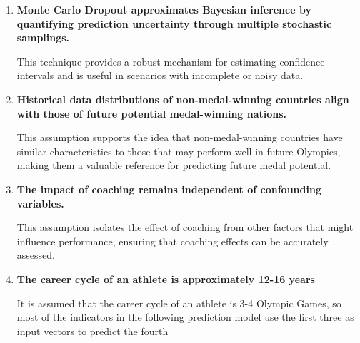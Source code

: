 \documentclass{mcmthesis}
\begin{document}
\begin{enumerate}[leftmargin=0.15in, labelsep=0.1in, itemsep=10pt, parsep=5pt]
	
	\item \textbf{Monte Carlo Dropout approximates Bayesian inference by quantifying prediction uncertainty through multiple stochastic samplings.}
	
	This technique provides a robust mechanism for estimating confidence intervals and is useful in scenarios with incomplete or noisy data.
	
	\item \textbf{Historical data distributions of non-medal-winning countries align with those of future potential medal-winning nations.} 
	
	This assumption supports the idea that non-medal-winning countries have similar characteristics to those that may perform well in future Olympics, making them a valuable reference for predicting future medal potential.
	
	\item \textbf{The impact of coaching remains independent of confounding variables.}
			
	This assumption isolates the effect of coaching from other factors that might influence performance, ensuring that coaching effects can be accurately assessed.
	\item \textbf{The career cycle of an athlete is approximately 12-16 years}
	
	It is assumed that the career cycle of an athlete is 3-4 Olympic Games, so most of the indicators in the following prediction model use the first three as input vectors to predict the fourth
\end{enumerate}

\end{document}
